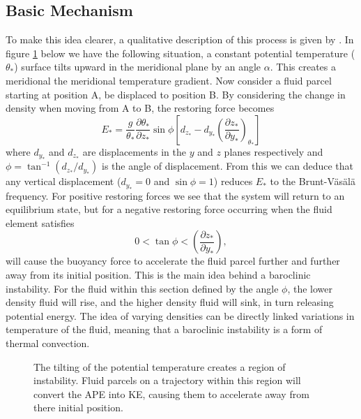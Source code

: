 \documentclass{article}
\begin{document}
\subsection{Basic Mechanism} 
To make this idea clearer, a qualitative description of this process is given by \cite{Pedlosky1979}. In figure \ref{pedloskyexample} below we have the following situation, a constant potential temperature ($\theta_*$) surface tilts upward in the meridional plane by an angle $\alpha$. This creates a meridional the meridional temperature gradient. Now consider a fluid parcel starting at position A, be displaced to position B. By considering the change in density when moving from A to B, the restoring force becomes  
\begin{equation}
  E_* = \frac{g}{\theta_*}\frac{\partial\theta_*}{\partial z_*}\sin\phi\left[d_{z_*}-d_{y_*}\left(\frac{\partial z_*}{\partial y_*}\right)_{\theta_*}\right]
\end{equation}
where $d_{y_*}$ and $d_{z_*}$ are displacements in the $y$ and $z$ planes respectively and $\phi=\tan^{-1}(d_{z_*}/d_{y_*})$ is the angle of displacement. From this we can deduce that any vertical displacement ($d_{y_*}=0$ and $\sin\phi = 1$) reduces $E_*$ to the Brunt-V\"as\"al\"a frequency. For positive restoring forces we see that the system will return to an equilibrium state, but for a negative restoring force occurring when the fluid element satisfies
\begin{equation}
  0 < \tan\phi < \left(\frac{\partial z_*}{\partial y_*}\right),
\end{equation}
will cause the buoyancy force to accelerate the fluid parcel further and further away from its initial position. This is the main idea behind a baroclinic instability. For the fluid within this section defined by the angle $\phi$, the lower density fluid will rise, and the higher density fluid will sink, in turn releasing potential energy. The idea of varying densities can be directly linked variations in temperature of the fluid, meaning that a baroclinic instability is a form of thermal convection.
\begin{figure}[hb]
  \centering
  
  \caption{The tilting of the potential temperature creates a region of instability. Fluid parcels on a trajectory within this region will convert the APE into KE, causing them to accelerate away from there initial position. }
  \label{pedloskyexample}
\end{figure}
\end{document}
